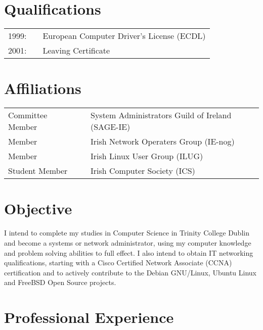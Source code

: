 \documentclass[a4paper, 11pt] {article}
\begin{document}
\section*{Qualifications}

\begin{tabular}{l l l}
1999: 	& 	&	European Computer Driver's License (ECDL) 		\\
2001:		& 	&	Leaving Certificate 										\\
\end{tabular}

\section*{Affiliations}

\begin{tabular}{l l l}
Committee Member	&	&	System Administrators Guild of Ireland (SAGE-IE)	\\
Member				&	&	Irish Network Operaters Group (IE-nog)					\\
Member				&	&	Irish Linux User Group (ILUG)								\\
Student Member 	&	& 	Irish Computer Society (ICS)						\\
\end{tabular}

\section*{Objective}

I intend to complete my studies in Computer Science in Trinity College 
Dublin and become a systems or network administrator, using my computer
knowledge and problem solving abilities to full effect. I also intend to
obtain IT networking qualifications, starting with a Cisco Certified
Network Associate (CCNA) certification and to actively contribute to the
Debian GNU/Linux, Ubuntu Linux and FreeBSD Open Source projects.

\section*{Professional Experience}
\end{document}
